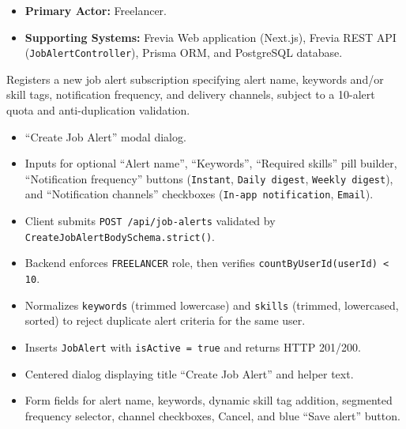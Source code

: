 
\begin{itemize}[leftmargin=1.6em,topsep=3pt,itemsep=2pt,parsep=0pt,label=$\bullet$]
    \item \textbf{Primary Actor:} Freelancer.
    \item \textbf{Supporting Systems:} Frevia Web application (Next.js), Frevia REST API (\texttt{JobAlertController}), Prisma ORM, and PostgreSQL database.
\end{itemize}

\noindent Registers a new job alert subscription specifying alert name, keywords and/or skill tags, notification frequency, and delivery channels, subject to a 10-alert quota and anti-duplication validation.

\begin{itemize}[leftmargin=1.6em,topsep=3pt,itemsep=2pt,parsep=0pt,label=$\bullet$]
    \item ``Create Job Alert'' modal dialog.
    \item Inputs for optional ``Alert name'', ``Keywords'', ``Required skills'' pill builder, ``Notification frequency'' buttons (\texttt{Instant}, \texttt{Daily digest}, \texttt{Weekly digest}), and ``Notification channels'' checkboxes (\texttt{In-app notification}, \texttt{Email}).
\end{itemize}

\begin{itemize}[leftmargin=1.6em,topsep=3pt,itemsep=2pt,parsep=0pt,label=$\bullet$]
    \item {\sloppy Client submits \texttt{POST /\allowbreak{}api/\allowbreak{}job-\allowbreak{}alerts} validated by \texttt{CreateJobAlertBodySchema.strict()}.\par}
    \item Backend enforces \texttt{FREELANCER} role, then verifies \texttt{countByUserId(userId) < 10}.
    \item Normalizes \texttt{keywords} (trimmed lowercase) and \texttt{skills} (trimmed, lowercased, sorted) to reject duplicate alert criteria for the same user.
    \item Inserts \texttt{JobAlert} with \texttt{isActive = true} and returns HTTP 201/200.
\end{itemize}

\begin{itemize}[leftmargin=1.6em,topsep=3pt,itemsep=2pt,parsep=0pt,label=$\bullet$]
    \item Centered dialog displaying title ``Create Job Alert'' and helper text.
    \item Form fields for alert name, keywords, dynamic skill tag addition, segmented frequency selector, channel checkboxes, Cancel, and blue ``Save alert'' button.
\end{itemize}


